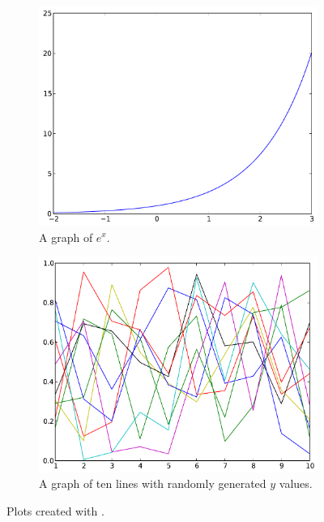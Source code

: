 \begin{figure}
\centering
\begin{subfigure}[t]{.49\textwidth}
\centering
\includegraphics[width=\textwidth]{exp_plot.pdf}
\caption{A graph of $e^x$.}
\label{fig:exp_plot}
\end{subfigure}
\begin{subfigure}[t]{.49\textwidth}
\centering
\includegraphics[width=\textwidth]{statemachine.pdf}
\caption{A graph of ten lines with randomly generated $y$ values.}
\label{fig:statemachine}
\end{subfigure}
\caption{Plots created with .}
\label{fig:lineplots}
\end{figure}

